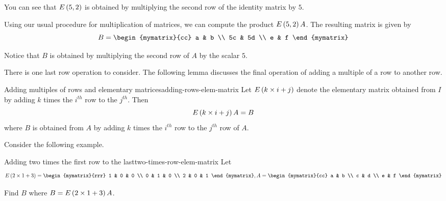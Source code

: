 \begin{solution}
You can see that $E \left(5, 2\right)$ is obtained by multiplying the second row 
of the identity matrix by $5$.

Using our usual procedure for multiplication of matrices, we can compute the product $E \left(5, 2\right)A$. The 
resulting matrix is given by 
\begin{equation*}
B
=\begin{mymatrix}{cc}
a & b \\
5c & 5d \\
e & f
\end{mymatrix}
\end{equation*}

Notice that $B$ is obtained by multiplying the second row of $A$ by the scalar $5$. 
\end{solution}

There is one last row operation to consider. The following lemma discusses the final
operation of adding a multiple of a row to another row.

\begin{lemma}{Adding multiples of rows and elementary matrices}{adding-rows-elem-matrix}
Let $E\left(k \times i+j\right) $ denote the elementary
matrix obtained from $I$ by adding $k$ times the $i^{th}$ row to the $j^{th}$. Then
\begin{equation*}
E\left(k \times i+j\right) A=B
\end{equation*}
where $B$ is obtained from $A$ by adding $k$ times the $i^{th}$ row to the $j^{th}$ row of $A$.
\end{lemma}

Consider the following example.

\begin{example}{Adding two times the first row to the last}{two-times-row-elem-matrix}
Let
\begin{equation*}
E\tup{2 \times 1+3} = \begin{mymatrix}{rrr}
1 & 0 & 0 \\
0 & 1 & 0 \\
2 & 0 & 1
\end{mymatrix}, A =  \begin{mymatrix}{cc}
a & b \\
c & d \\
e & f
\end{mymatrix} 
\end{equation*}

Find $B$ where $B = E\left(2 \times 1+3\right)A$.
\end{example}

